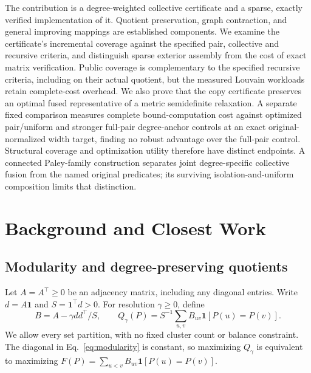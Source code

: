 \documentclass[sigconf,anonymous,review]{acmart}
\newcommand{\1}{\mathbf{1}}
\begin{document}
The contribution is a degree-weighted collective certificate and a sparse,
exactly verified implementation of it. Quotient preservation, graph contraction,
and general improving mappings are established components. We examine the
certificate's incremental coverage against the specified pair, collective and recursive criteria,
and distinguish sparse exterior assembly from the cost of exact matrix
verification. Public coverage is complementary to the specified recursive
criteria, including on their actual quotient, but the measured Louvain
workloads retain complete-cost overhead. We also prove that the copy
certificate preserves an optimal fused representative of a metric
semidefinite relaxation. A separate fixed comparison measures complete
bound-computation cost against optimized pair/uniform and stronger full-pair
degree-anchor controls at an exact original-normalized width target, finding
no robust advantage over the full-pair control.
Structural coverage and optimization utility therefore have distinct
endpoints. A connected Paley-family construction separates joint
degree-specific collective fusion from the named original predicates; its
surviving isolation-and-uniform composition limits that distinction.

\section{Background and Closest Work}
\subsection{Modularity and degree-preserving quotients}
Let $A=A^\top\geq 0$ be an adjacency matrix, including any diagonal entries.
Write $d=A\1$ and $S=\1^\top d>0$. For resolution $\gamma\geq 0$, define
\begin{equation}
 B=A-\gamma dd^\top/S,\qquad
 Q_\gamma(P)=S^{-1}\sum_{u,v}B_{uv}\1[P(u)=P(v)].
 \label{eq:modularity}
\end{equation}
We allow every set partition, with no fixed cluster count or balance constraint.
The diagonal in Eq.~\eqref{eq:modularity} is constant, so maximizing $Q_\gamma$ is equivalent to
maximizing $F(P)=\sum_{u<v}B_{uv}\1[P(u)=P(v)]$.
\end{document}
